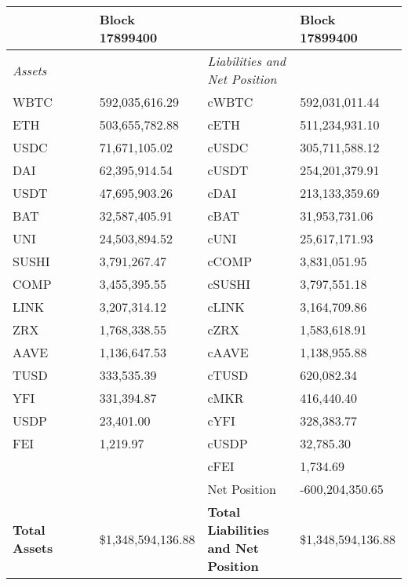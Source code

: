 
\begin{longtable}{@{}p{0.25\linewidth}p{0.25\linewidth}p{0.25\linewidth}p{0.25\linewidth}@{}}

\toprule


& Block 17899400 & & Block 17899400 \\

\midrule
\textit{Assets} & & \textit{Liabilities and Net Position} \\
WBTC & 592,035,616.29 & cWBTC & 592,031,011.44 \\
ETH & 503,655,782.88 & cETH & 511,234,931.10 \\
USDC & 71,671,105.02 & cUSDC & 305,711,588.12 \\
DAI & 62,395,914.54 & cUSDT & 254,201,379.91 \\
USDT & 47,695,903.26 & cDAI & 213,133,359.69 \\
BAT & 32,587,405.91 & cBAT & 31,953,731.06 \\
UNI & 24,503,894.52 & cUNI & 25,617,171.93 \\
SUSHI & 3,791,267.47 & cCOMP & 3,831,051.95 \\
COMP & 3,455,395.55 & cSUSHI & 3,797,551.18 \\
LINK & 3,207,314.12 & cLINK & 3,164,709.86 \\
ZRX & 1,768,338.55 & cZRX & 1,583,618.91 \\
AAVE & 1,136,647.53 & cAAVE & 1,138,955.88 \\
TUSD & 333,535.39 & cTUSD & 620,082.34 \\
YFI & 331,394.87 & cMKR & 416,440.40 \\
USDP & 23,401.00 & cYFI & 328,383.77 \\
FEI & 1,219.97 & cUSDP & 32,785.30 \\
 &  & cFEI & 1,734.69 \\
 &  & Net Position & -600,204,350.65 \\

\midrule

\textbf{Total Assets} & \$1,348,594,136.88 & \textbf{Total Liabilities and Net Position} & \$1,348,594,136.88 \\

\bottomrule

\end{longtable}
